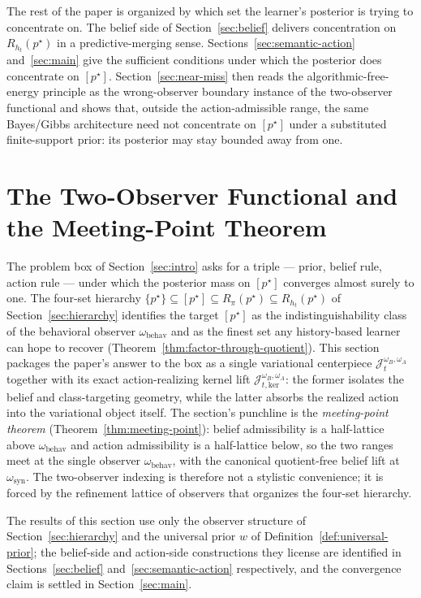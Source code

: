 \documentclass[11pt]{article}
\theoremstyle{definition}
\theoremstyle{remark}
\begin{document}
The rest of the paper is organized by which set the learner's posterior is trying to concentrate on. The belief side of Section~\ref{sec:belief} delivers concentration on $R_{h_t}(p^\star)$ in a predictive-merging sense. Sections~\ref{sec:semantic-action} and~\ref{sec:main} give the sufficient conditions under which the posterior does concentrate on $[p^\star]$. Section~\ref{sec:near-miss} then reads the algorithmic-free-energy principle as the wrong-observer boundary instance of the two-observer functional and shows that, outside the action-admissible range, the same Bayes/Gibbs architecture need not concentrate on $[p^\star]$ under a substituted finite-support prior: its posterior may stay bounded away from one.

\section{The Two-Observer Functional and the Meeting-Point Theorem}
\label{sec:functional}

The problem box of Section~\ref{sec:intro} asks for a triple --- prior, belief rule, action rule --- under which the posterior mass on $[p^\star]$ converges almost surely to one. The four-set hierarchy $\{p^\star\}\subseteq[p^\star]\subseteq R_\pi(p^\star)\subseteq R_{h_t}(p^\star)$ of Section~\ref{sec:hierarchy} identifies the target $[p^\star]$ as the indistinguishability class of the behavioral observer $\omega_{\mathrm{behav}}$ and as the finest set any history-based learner can hope to recover (Theorem~\ref{thm:factor-through-quotient}). This section packages the paper's answer to the box as a single variational centerpiece $\mathcal J_t^{\omega_B,\omega_A}$ together with its exact action-realizing kernel lift $\mathcal J_{t,\mathrm{ker}}^{\omega_B,\omega_A}$: the former isolates the belief and class-targeting geometry, while the latter absorbs the realized action into the variational object itself. The section's punchline is the \emph{meeting-point theorem} (Theorem~\ref{thm:meeting-point}): belief admissibility is a half-lattice above $\omega_{\mathrm{behav}}$ and action admissibility is a half-lattice below, so the two ranges meet at the single observer $\omega_{\mathrm{behav}}$, with the canonical quotient-free belief lift at $\omega_{\mathrm{syn}}$. The two-observer indexing is therefore not a stylistic convenience; it is forced by the refinement lattice of observers that organizes the four-set hierarchy.

The results of this section use only the observer structure of Section~\ref{sec:hierarchy} and the universal prior $w$ of Definition~\ref{def:universal-prior}; the belief-side and action-side constructions they license are identified in Sections~\ref{sec:belief} and~\ref{sec:semantic-action} respectively, and the convergence claim is settled in Section~\ref{sec:main}.
\end{document}
